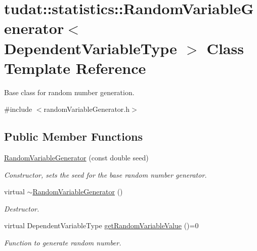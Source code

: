 \hypertarget{classtudat_1_1statistics_1_1RandomVariableGenerator}{}\section{tudat\+:\+:statistics\+:\+:Random\+Variable\+Generator$<$ Dependent\+Variable\+Type $>$ Class Template Reference}
\label{classtudat_1_1statistics_1_1RandomVariableGenerator}


Base class for random number generation.  




{\ttfamily \#include $<$random\+Variable\+Generator.\+h$>$}

\subsection*{Public Member Functions}
\begin{DoxyCompactItemize}
\item 
\hyperlink{classtudat_1_1statistics_1_1RandomVariableGenerator_a1c76f64e24da9ff114c38d92538a8dd0}{Random\+Variable\+Generator} (const double seed)
\begin{DoxyCompactList}\small\item\em Constructor, sets the seed for the base random number generator. \end{DoxyCompactList}\item 
virtual \hyperlink{classtudat_1_1statistics_1_1RandomVariableGenerator_a267e1b8d4d8f4f78d73d8411f623bc9d}{$\sim$\+Random\+Variable\+Generator} ()\hypertarget{classtudat_1_1statistics_1_1RandomVariableGenerator_a267e1b8d4d8f4f78d73d8411f623bc9d}{}\label{classtudat_1_1statistics_1_1RandomVariableGenerator_a267e1b8d4d8f4f78d73d8411f623bc9d}

\begin{DoxyCompactList}\small\item\em Destructor. \end{DoxyCompactList}\item 
virtual Dependent\+Variable\+Type \hyperlink{classtudat_1_1statistics_1_1RandomVariableGenerator_a8fec0a593026cd247608027404ef4438}{get\+Random\+Variable\+Value} ()=0
\begin{DoxyCompactList}\small\item\em Function to generate random number. \end{DoxyCompactList}\end{DoxyCompactItemize}
